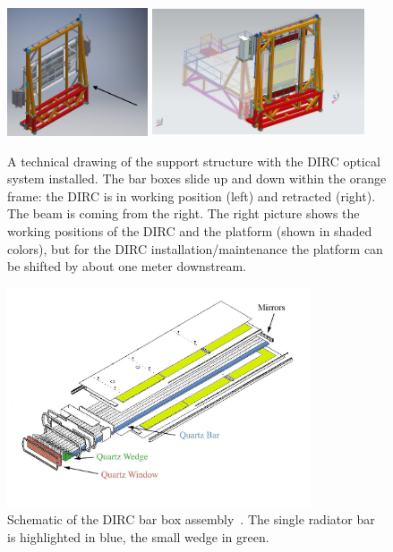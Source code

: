 \begin{figure}[h]
\includegraphics[width=0.37\textwidth]{pics/support.png} \hspace{0.2cm}
\includegraphics[width=0.56\textwidth]{pics/Full_Assy_Iso-retracted.pdf}
\caption{\label{pic:support} A technical drawing of the support structure with the DIRC optical system installed. 
The bar boxes slide up and down within the orange frame: the DIRC is in working position (left) and retracted (right). 
The beam is coming from the right. The right picture shows the working positions of the DIRC and the platform (shown in shaded colors), but for the DIRC installation/maintenance the platform can be shifted by about one meter downstream.}
\end{figure}

\begin{figure}[!h]
\centering
\includegraphics[width=0.8\textwidth]{pics/bab_col.jpg}
\caption{\label{pic:bbox} Schematic of the \babar DIRC bar box assembly~\cite{bdirc1}. The single radiator bar is highlighted in blue, the small wedge in green.}
\end{figure}

